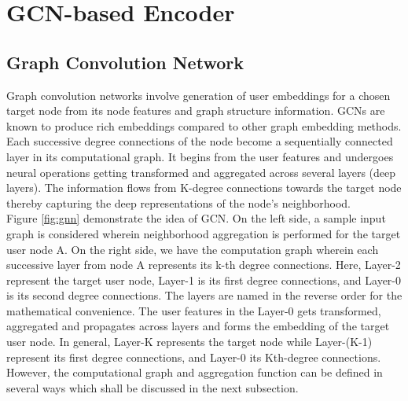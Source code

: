 \documentclass{kththesis}
\begin{document}
\section{GCN-based Encoder}
\subsection{Graph Convolution Network}
Graph convolution networks involve generation of user embeddings for a chosen target node from its node features and graph structure information. GCNs are known to produce rich embeddings compared to other graph embedding methods. Each successive degree connections of the node become a sequentially connected layer in its computational graph. It begins from the user features and undergoes neural operations getting transformed and aggregated across several layers (deep layers). The information flows from K-degree connections towards the target node thereby capturing the deep representations of the node's neighborhood. \\

Figure \ref{fig:gnn} demonstrate the idea of GCN. On the left side, a sample input graph is considered wherein neighborhood aggregation is performed for the target user node A. On the right side, we have the computation graph wherein each successive layer from node A represents its k-th degree connections. Here, Layer-2 represent the target user node, Layer-1 is its first degree connections, and Layer-0 is its second degree connections. The layers are named in the reverse order for the mathematical convenience. The user features in the Layer-0 gets transformed, aggregated and propagates across layers and forms the embedding of the target user node. In general, Layer-K represents the target node while Layer-(K-1) represent its first degree connections, and Layer-0 its Kth-degree connections. However, the computational graph and aggregation function can be defined in several ways which shall be discussed in the next subsection. \\
\end{document}
